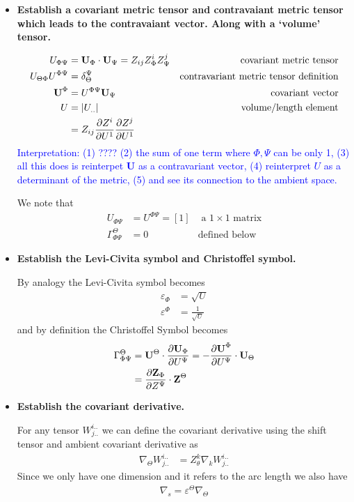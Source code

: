 \documentclass[12pt,a4paper]{report}
\newcommand{\BLUE}[1]{\textcolor{blue}{#1}}
\newcommand{\COFF}[3]{\PART{\textbf{Z}_{#2}}{Z^{#3}}\cdot\textbf{Z}^{#1}}
\begin{document}
\begin{description}
\begin{itemize}
		\item \textbf{Establish a covariant metric tensor and contravaiant metric tensor which leads to the contravaiant vector.  Along with a `volume' tensor.}

			\begin{align}
				U_{\Phi\Psi} &= \textbf{U}_\Phi\cdot \textbf{U}_\Psi = Z_{ij}Z^i_\Phi Z^j_\Psi & \text{covariant metric tensor}\\
				U_{\Theta\Phi}U^{\Phi\Psi} &= \delta^\Psi_\Theta  & \text{contravariant metric tensor definition}\\
				\textbf{U}^\Phi &= U^{\Phi\Psi}\textbf{U}_\Psi & \text{covariant vector}\\
				U &= |U_{..}| & \text{volume/length element} \\
				&= Z_{ij}\frac{\partial Z^i}{\partial U^1}\frac{\partial Z^j}{\partial U^1}
			\end{align}\BLUE{Interpretation: (1) ???? (2) the sum of one term where $\Phi,\Psi$ can be only 1, (3) all this does is reinterpet $\textbf{U}$ as a contravariant vector, (4) reinterpret $U$ as a determinant of the metric, (5) and see its connection to the ambient space.}
			
			We note that 
			\begin{align*}
				U_{\Phi\Psi} &= U^{\Phi\Psi} = [1] & \text{ a $1\times 1$ matrix}\\
				\Gamma^\Theta_{\Phi\Psi} &=0 & \text{defined below}
			\end{align*}

		\item \textbf{Establish the Levi-Civita symbol and Christoffel symbol.}

		By analogy the Levi-Civita symbol becomes
		\begin{align*}
			\varepsilon_\Phi &= \sqrt{U} \\
			\varepsilon^\Phi &= \frac{1}{\sqrt{U}} 
		\end{align*} and by definition the Christoffel Symbol becomes
		\begin{align*}
			\Gamma^\Theta_{\Phi\Psi} &= \textbf{U}^\Theta \cdot \PART{\textbf{U}_\Phi}{U^\Psi} = -\PART{\textbf{U}^\Phi}{U^\Psi} \cdot \textbf{U}_\Theta  \\
				&= \COFF{\Theta}{\Phi}{\Psi}
		\end{align*}

		\item \textbf{Establish the covariant derivative.}

			For any tensor $W^{i..}_{j..}$ we can define the covariant derivative using the shift tensor and ambient covariant derivative as
			\begin{align*}
				\nabla_\Theta W^{i..}_{j..} &= Z^k_\theta \nabla_k W^{i..}_{j..}
			\end{align*}Since we only have one dimension and it refers to the arc length we also have
			\begin{align*}
				\nabla_s = \varepsilon^\Theta \nabla_\Theta
			\end{align*}


\end{itemize}
\end{description}
\end{document}
